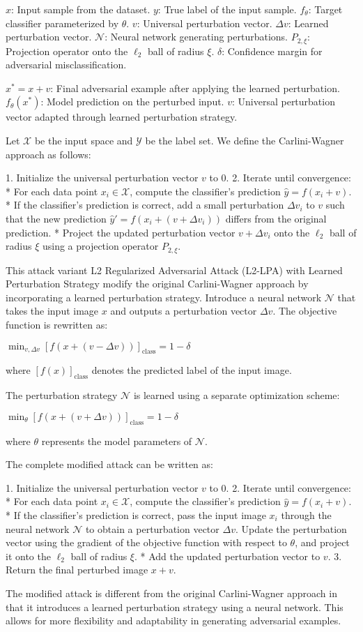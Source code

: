 $x$: Input sample from the dataset.
$y$: True label of the input sample.
$f_{\theta}$: Target classifier parameterized by $\theta$.
$v$: Universal perturbation vector.
$\Delta v$: Learned perturbation vector.
$\mathcal{N}$: Neural network generating perturbations.
$P_{2, \xi}$: Projection operator onto the $\ell_2$ ball of radius $\xi$.
$\delta$: Confidence margin for adversarial misclassification.

$x^* = x + v$: Final adversarial example after applying the learned perturbation.
$f_{\theta}(x^*)$: Model prediction on the perturbed input.
$v$: Universal perturbation vector adapted through learned perturbation strategy.

Let $\mathcal{X}$ be the input space and $\mathcal{Y}$ be the label set. We define the Carlini-Wagner approach as follows:

1. Initialize the universal perturbation vector $v$ to 0.
2. Iterate until convergence:
	* For each data point $x_i \in \mathcal{X}$, compute the classifier's prediction $\hat{y} = f(x_i + v)$.
	* If the classifier's prediction is correct, add a small perturbation $\Delta v_i$ to $v$ such that the new prediction $\hat{y}' = f(x_i + (v + \Delta v_i))$ differs from the original prediction.
	* Project the updated perturbation vector $v + \Delta v_i$ onto the $\ell_2$ ball of radius $\xi$ using a projection operator $P_{2, \xi}$.

This attack variant L2 Regularized Adversarial Attack (L2-LPA) with Learned Perturbation Strategy modify the original Carlini-Wagner approach by incorporating a learned perturbation strategy. Introduce a neural network $\mathcal{N}$ that takes the input image $x$ and outputs a perturbation vector $\Delta v$. The objective function is rewritten as:

$\min_{v, \Delta v} [f(x + (v - \Delta v))]_{\text{class}} = 1 - \delta$

where $[f(x)]_{\text{class}}$ denotes the predicted label of the input image.

The perturbation strategy $\mathcal{N}$ is learned using a separate optimization scheme:

$\min_{\theta} [f(x + (v + \Delta v))]_{\text{class}} = 1 - \delta$

where $\theta$ represents the model parameters of $\mathcal{N}$.

The complete modified attack can be written as:

1. Initialize the universal perturbation vector $v$ to 0.
2. Iterate until convergence:
	* For each data point $x_i \in \mathcal{X}$, compute the classifier's prediction $\hat{y} = f(x_i + v)$.
	* If the classifier's prediction is correct, pass the input image $x_i$ through the neural network $\mathcal{N}$ to obtain a perturbation vector $\Delta v$. Update the perturbation vector using the gradient of the objective function with respect to $\theta$, and project it onto the $\ell_2$ ball of radius $\xi$.
	* Add the updated perturbation vector to $v$.
3. Return the final perturbed image $x + v$.

The modified attack is different from the original Carlini-Wagner approach in that it introduces a learned perturbation strategy using a neural network. This allows for more flexibility and adaptability in generating adversarial examples.